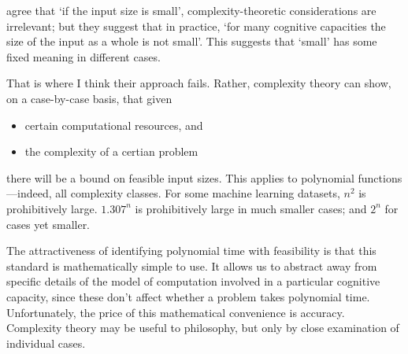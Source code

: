 \textcite[§ 9.9]{vanrooij2019} agree that ‘if the input size is small’, complexity-theoretic considerations are irrelevant; but they suggest that in practice, ‘for many cognitive capacities the size of the input as a whole is not small’. This suggests that ‘small’ has some fixed meaning in different cases.

That is where I think their approach fails. Rather, complexity theory can show, on a case-by-case basis, that given
\begin{itemize}
    \item certain computational resources, and
    \item the complexity of a certian problem
\end{itemize}
there will be a bound on feasible input sizes. This applies to polynomial functions—indeed, all complexity classes. For some machine learning datasets, \(n^2\) is prohibitively large. \(1.307^n\) is prohibitively large in much smaller cases; and \(2^n\) for cases yet smaller.

The attractiveness of identifying polynomial time with feasibility is that this standard is mathematically simple to use. It allows us to abstract away from specific details of the model of computation involved in a particular cognitive capacity, since these don’t affect whether a problem takes polynomial time. Unfortunately, the price of this mathematical convenience is accuracy. Complexity theory may be useful to philosophy, but only by close examination of individual cases.